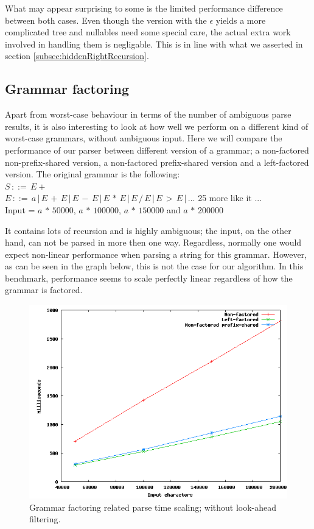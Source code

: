 \documentclass[a4paper,10pt]{article}
\begin{document}
What may appear surprising to some is the limited performance difference between both cases. Even though the version with the $\epsilon$ yields a more complicated tree and nullables need some special care, the actual extra work involved in handling them is negligable. This is in line with what we asserted in section \ref{subsec:hiddenRightRecursion}.

\subsection{Grammar factoring}
\label{sec:factoringBenchmark}

Apart from worst-case behaviour in terms of the number of ambiguous parse results, it is also interesting to look at how well we perform on a different kind of worst-case grammars, without ambiguous input. Here we will compare the performance of our parser between different version of a grammar; a non-factored non-prefix-shared version, a non-factored prefix-shared version and a left-factored version. The original grammar is the following:\\
$S\,::=\,E+$\\
$E\,::=\,a\,|\,E\,+\,E\,|\,E\,-\,E\,|\,E\,*\,E\,|\,E\,/\,E\,|\,E\,>\,E\,|\,...$ 25 more like it ...\\
Input = $a\,*\,50000$, $a\,*\,100000$, $a\,*\,150000$ and $a\,*\,200000$

It contains lots of recursion and is highly ambiguous; the input, on the other hand, can not be parsed in more then one way. Regardless, normally one would expect non-linear performance when parsing a string for this grammar. However, as can be seen in the graph below, this is not the case for our algorithm. In this benchmark, performance seems to scale perfectly linear regardless of how the grammar is factored.

\begin{figure}[H]
\centering
\includegraphics[scale=0.55]{grammar-factoring.png}
\caption{Grammar factoring related parse time scaling; without look-ahead filtering.}
\end{figure}
\end{document}
